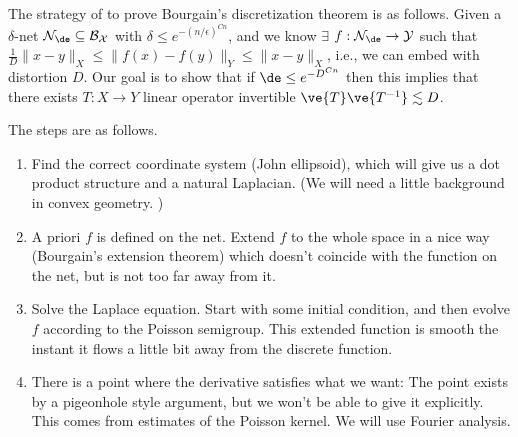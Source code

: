 The strategy of to prove Bourgain's discretization theorem is as follows. Given a $\delta$-net $\cal N_{\de} \subseteq B_X$ with $\delta \leq e^{-(n/\epsilon)^{Cn}}$, and we know $\exists $ $f: \cal N_{\de} \to Y$ such that $\frac{1}{D}\|x - y\|_X \leq \|f(x) - f(y)\|_Y \leq \|x - y\|_X$, i.e., we can embed with distortion $D$. 
Our goal is to show that if $\de\le e^{-D^{Cn}}$ then this implies that there exists $T:X\to Y$ linear operator invertible $\ve{T}\ve{T^{-1}}\lesssim D$. 

The steps are as follows. 
\begin{enumerate}
\item
Find the correct coordinate system (John ellipsoid), which will give us a dot product structure and a natural Laplacian. (We will need a little background in convex geometry. )
\item
A priori $f$ is defined on the net. Extend $f$ to the whole space in a nice way (Bourgain's extension theorem) which doesn't coincide with the function on the net, but is not too far away from it.
\item
Solve the Laplace equation. Start with some initial condition, and then evolve $f$ according to the Poisson semigroup. This extended function is smooth the instant it flows a little bit away from the discrete function.
\item
There is a point where the derivative satisfies what we want: The point exists by a pigeonhole style argument, but we won't be able to give it explicitly. This comes from estimates of the Poisson kernel. We will use Fourier analysis. 
\end{enumerate}
